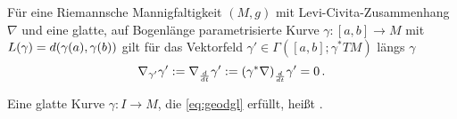\begin{satz}
Für eine Riemannsche Mannigfaltigkeit $(M, g)$ mit Levi-Civita-Zusammenhang $\nabla$ und eine glatte, auf Bogenlänge parametrisierte Kurve $\gamma: [a, b] \rightarrow M$ mit $L(\gamma) = d\qty(\gamma(a), \gamma(b))$ gilt für das Vektorfeld $\gamma' \in \Gamma([a, b]; \gamma^* TM)$ längs $\gamma$
\begin{equation}\label{eq:geodgl}
\nabla_{\gamma'} \gamma' := \nabla_{\dv{t}} \gamma' := \qty(\gamma^* \nabla)_{\dv{t}} \gamma' = 0 \, .
\end{equation}
\end{satz}

\begin{defi}[Geodäte]
Eine glatte Kurve $\gamma: I \rightarrow M$, die \eqref{eq:geodgl} erfüllt, heißt .
\end{defi}

